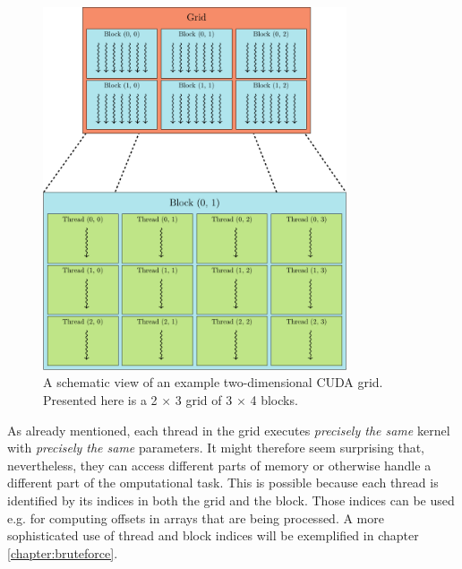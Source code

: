 \begin{figure}[ht]
    \centering
    \includegraphics[width=0.8\textwidth]{figures/cuda_grid}
    \caption{A schematic view of an example two-dimensional CUDA grid. Presented here is a 2 $\times$ 3 grid of 3 $\times$ 4 blocks.}
    \label{fig:cuda_grid}
\end{figure}

As already mentioned, each thread in the grid executes \emph{precisely the same} kernel with
\emph{precisely the same} parameters. It might therefore seem surprising that, nevertheless, they
can access different parts of memory or otherwise handle a different part of the omputational task.
This is possible because each thread is identified by its indices in both the grid and the block.
Those indices can be used e.g. for computing offsets in arrays that are being processed. A more
sophisticated use of thread and block indices will be exemplified in chapter \ref{chapter:bruteforce}.


